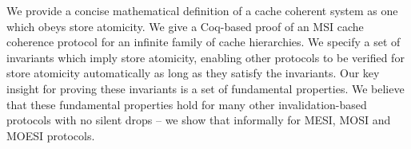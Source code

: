 We provide a concise mathematical definition of a cache coherent system as one
which obeys store atomicity. We give a Coq-based proof of an MSI cache
coherence protocol for an infinite family of cache hierarchies. We specify a
set of invariants which imply store atomicity, enabling other protocols to be
verified for store atomicity automatically as long as they satisfy the
invariants. Our key insight for proving these invariants is a set of
fundamental properties.  We believe that these fundamental properties hold for
many other invalidation-based protocols with no silent drops -- we show that
informally for MESI, MOSI and MOESI protocols.


